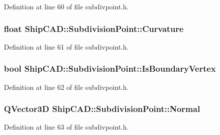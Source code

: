 Definition at line 60 of file subdivpoint.\-h.

\hypertarget{classShipCAD_1_1SubdivisionPoint_a30f533619dcb24eb00188772c99564b4}{
\subsubsection[{Curvature}]{\setlength{\rightskip}{0pt plus 5cm}float Ship\-C\-A\-D\-::\-Subdivision\-Point\-::\-Curvature\hspace{0.3cm}{\ttfamily [read]}}}\label{classShipCAD_1_1SubdivisionPoint_a30f533619dcb24eb00188772c99564b4}


Definition at line 61 of file subdivpoint.\-h.

\hypertarget{classShipCAD_1_1SubdivisionPoint_ad78eae7c6c9a35c329f1137817e10a8d}{
\subsubsection[{Is\-Boundary\-Vertex}]{\setlength{\rightskip}{0pt plus 5cm}bool Ship\-C\-A\-D\-::\-Subdivision\-Point\-::\-Is\-Boundary\-Vertex\hspace{0.3cm}{\ttfamily [read]}}}\label{classShipCAD_1_1SubdivisionPoint_ad78eae7c6c9a35c329f1137817e10a8d}


Definition at line 62 of file subdivpoint.\-h.

\hypertarget{classShipCAD_1_1SubdivisionPoint_aeaf744ea3deb2bdc55e9e90d3e8b58a2}{
\subsubsection[{Normal}]{\setlength{\rightskip}{0pt plus 5cm}Q\-Vector3\-D Ship\-C\-A\-D\-::\-Subdivision\-Point\-::\-Normal\hspace{0.3cm}{\ttfamily [read]}}}\label{classShipCAD_1_1SubdivisionPoint_aeaf744ea3deb2bdc55e9e90d3e8b58a2}


Definition at line 63 of file subdivpoint.\-h.

